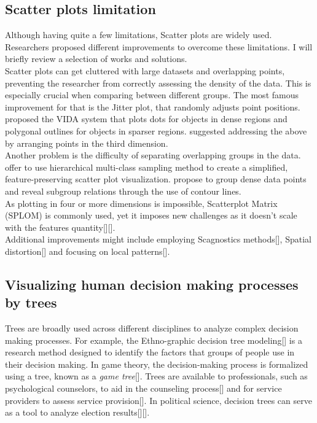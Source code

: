 \documentclass[11pt]{article}
\begin{document}
\subsection{Scatter plots limitation}\label{Scatter plots limitation}
Although having quite a few limitations, Scatter plots are widely used. Researchers proposed different improvements to overcome these limitations. I will briefly review a selection of works and solutions.\\
Scatter plots can get cluttered with large datasets and overlapping points, preventing the researcher from correctly assessing the density of the data. This is especially crucial when comparing between different groups. The most famous improvement for that is the Jitter plot, that randomly adjusts point positions. \cite{woodruff1998constant} proposed the VIDA system that plots dots for objects in dense regions and polygonal outlines for objects in sparser regions. \cite{dang2010stacking} suggested addressing the above by arranging points in the third dimension.\\
Another problem is the difficulty of separating overlapping groups in the data. \cite{lee2012ieee} offer to use hierarchical multi-class sampling method to create a simplified, feature-preserving scatter plot visualization. \cite{mayorga2013splatterplots} propose to group dense data points and reveal subgroup relations through the use of contour lines.\\
As plotting in four or more dimensions is impossible, Scatterplot Matrix (SPLOM) is commonly used, yet it imposes new challenges as it doesn’t scale with the features quantity[][].\\
Additional improvements might include employing Scagnostics methods[], Spatial distortion[] and focusing on local patterns[].
\subsection{Visualizing human decision making processes by trees
}\label{Visualizing human decision making processes by trees}
Trees are broadly used across different disciplines to analyze complex decision making processes. For example, the Ethno-graphic decision tree modeling[] is a research method designed to identify the factors that groups of people use in their decision making. In game theory, the decision-making process is formalized using a tree, known as a \textit{game tree}[]. Trees are available to professionals, such as psychological counselors, to aid in the counseling process[] and for service providers to assess service provision[]. In political science, decision trees can serve as a tool to analyze election results[][].
\end{document}
